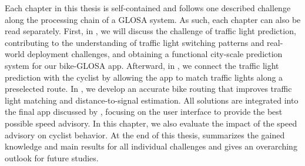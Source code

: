Each chapter in this thesis is self-contained and follows one described challenge along the processing chain of a GLOSA system. As such, each chapter can also be read separately. First, in , we will discuss the challenge of traffic light prediction, contributing to the understanding of traffic light switching patterns and real-world deployment challenges, and obtaining a functional city-scale prediction system for our bike-GLOSA app. Afterward, in , we connect the traffic light prediction with the cyclist by allowing the app to match traffic lights along a preselected route. In , we develop an accurate bike routing that improves traffic light matching and distance-to-signal estimation. All solutions are integrated into the final app discussed by , focusing on the user interface to provide the best possible speed advisory. In this chapter, we also evaluate the impact of the speed advisory on cyclist behavior. At the end of this thesis,  summarizes the gained knowledge and main results for all individual challenges and gives an overarching outlook for future studies.
